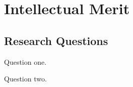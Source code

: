 \chapter{Intellectual Merit}
\thispagestyle{empty}




\section{Research Questions}
\label{section-researchquestions}

\begin{researchquestions}

\item Question one.

\label{Q1}

\item Question two.

\label{Q2}

\end{researchquestions}

\clearpage
